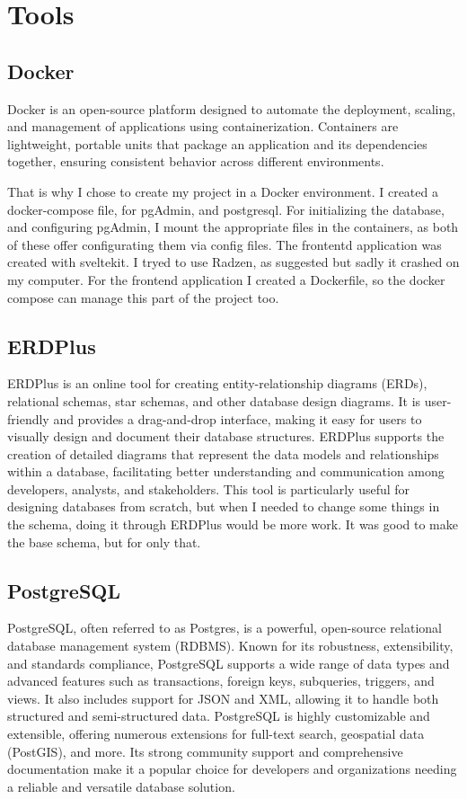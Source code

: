 \documentclass[12pt]{report}
\begin{document}
\chapter{Tools}

\section{Docker}

Docker is an open-source platform designed to automate the deployment, scaling, and management of applications using containerization. Containers are lightweight, portable units that package an application and its dependencies together, ensuring consistent behavior across different environments.

That is why I chose to create my project in a Docker environment. I created a docker-compose file, for pgAdmin, and postgresql. For initializing the database, and configuring pgAdmin, I mount the appropriate files in the containers, as both of these offer configurating them via config files.
The frontentd application was created with sveltekit. I tryed to use Radzen, as suggested but sadly it crashed on my computer. For the frontend application I created a Dockerfile, so the docker compose can manage this part of the project too.

\section{ERDPlus}

ERDPlus is an online tool for creating entity-relationship diagrams (ERDs), relational schemas, star schemas, and other database design diagrams. It is user-friendly and provides a drag-and-drop interface, making it easy for users to visually design and document their database structures. ERDPlus supports the creation of detailed diagrams that represent the data models and relationships within a database, facilitating better understanding and communication among developers, analysts, and stakeholders. This tool is particularly useful for designing databases from scratch, but when I needed to change some things in the schema, doing it through ERDPlus would be more work. It was good to make the base schema, but for only that.

\section{PostgreSQL}

PostgreSQL, often referred to as Postgres, is a powerful, open-source relational database management system (RDBMS). Known for its robustness, extensibility, and standards compliance, PostgreSQL supports a wide range of data types and advanced features such as transactions, foreign keys, subqueries, triggers, and views. It also includes support for JSON and XML, allowing it to handle both structured and semi-structured data. PostgreSQL is highly customizable and extensible, offering numerous extensions for full-text search, geospatial data (PostGIS), and more. Its strong community support and comprehensive documentation make it a popular choice for developers and organizations needing a reliable and versatile database solution.
\end{document}
